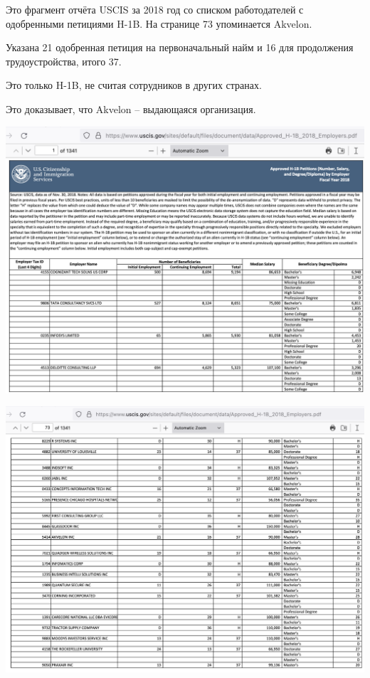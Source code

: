 
Это фрагмент отчёта USCIS за 2018 год со списком работодателей с одобренными петициями H-1B.
На странице 73 упоминается Akvelon.

Указана 21 одобренная петиция на первоначальный найм
и 16 для продолжения трудоустройства, итого 37.

Это только H-1B, не считая сотрудников в других странах.

Это доказывает, что Akvelon -- выдающаяся организация.

\includegraphics[width=\textwidth]{akvelon-uscis-approved-p1}
\WillContinue
\pagebreak

\Continuing
\includegraphics[width=\textwidth]{akvelon-uscis-approved-p73}

\pagebreak
